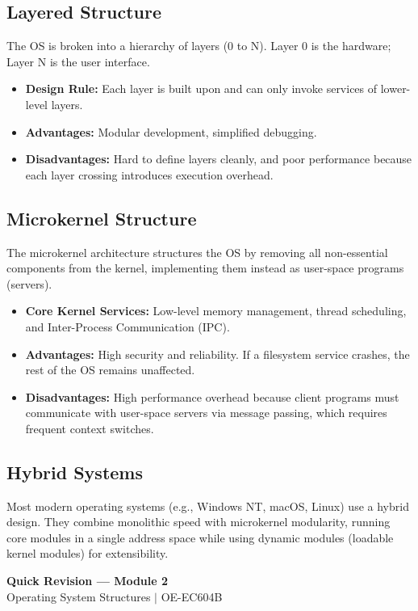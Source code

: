 \documentclass[12pt,a4paper]{article}
\begin{document}
\subsection{Layered Structure}
The OS is broken into a hierarchy of layers (0 to N). Layer 0 is the hardware; Layer N is the user interface.
\begin{itemize}[leftmargin=*, itemsep=3pt]
  \item \textbf{Design Rule:} Each layer is built upon and can only invoke services of lower-level layers.
  \item \textbf{Advantages:} Modular development, simplified debugging.
  \item \textbf{Disadvantages:} Hard to define layers cleanly, and poor performance because each layer crossing introduces execution overhead.
\end{itemize}

\subsection{Microkernel Structure}
The microkernel architecture structures the OS by removing all non-essential components from the kernel, implementing them instead as user-space programs (servers).
\begin{itemize}[leftmargin=*, itemsep=3pt]
  \item \textbf{Core Kernel Services:} Low-level memory management, thread scheduling, and Inter-Process Communication (IPC).
  \item \textbf{Advantages:} High security and reliability. If a filesystem service crashes, the rest of the OS remains unaffected.
  \item \textbf{Disadvantages:} High performance overhead because client programs must communicate with user-space servers via message passing, which requires frequent context switches.
\end{itemize}

\subsection{Hybrid Systems}
Most modern operating systems (e.g., Windows NT, macOS, Linux) use a hybrid design. They combine monolithic speed with microkernel modularity, running core modules in a single address space while using dynamic modules (loadable kernel modules) for extensibility.

\newpage
\begin{center}
  {\large\bfseries\color{myred} Quick Revision --- Module 2}\\[3pt]
  {\small\color{mydark} Operating System Structures $|$ OE-EC604B}
\end{center}
\noindent{\color{myred}\rule{\linewidth}{1.2pt}}
\vspace{4pt}
\end{document}
